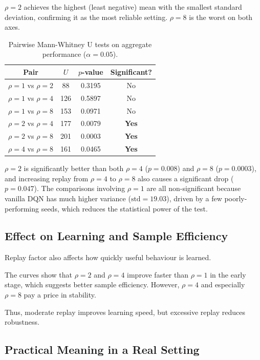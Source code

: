 \documentclass[11pt,a4paper]{article}
\begin{document}
\(\rho=2\) achieves the highest (least negative) mean with the smallest standard deviation, confirming it as the most reliable setting. \(\rho=8\) is the worst on both axes.

\begin{table}[H]
\centering
\caption{Pairwise Mann-Whitney U tests on aggregate performance (\(\alpha=0.05\)).}
\label{tab:q4a_mwu}
\renewcommand{\arraystretch}{1.2}
\begin{tabular}{cccc}
\toprule
Pair & \(U\) & \(p\)-value & Significant? \\
\midrule
\(\rho=1\) vs \(\rho=2\) & 88  & 0.3195 & No  \\
\(\rho=1\) vs \(\rho=4\) & 126 & 0.5897 & No  \\
\(\rho=1\) vs \(\rho=8\) & 153 & 0.0971 & No  \\
\(\rho=2\) vs \(\rho=4\) & 177 & 0.0079 & \textbf{Yes} \\
\(\rho=2\) vs \(\rho=8\) & 201 & 0.0003 & \textbf{Yes} \\
\(\rho=4\) vs \(\rho=8\) & 161 & 0.0465 & \textbf{Yes} \\
\bottomrule
\end{tabular}
\end{table}

\(\rho=2\) is significantly better than both \(\rho=4\) (\(p=0.008\)) and \(\rho=8\) (\(p=0.0003\)), and increasing replay from \(\rho=4\) to \(\rho=8\) also causes a significant drop (\(p=0.047\)). The comparisons involving \(\rho=1\) are all non-significant because vanilla DQN has much higher variance (\(\text{std}=19.03\)), driven by a few poorly-performing seeds, which reduces the statistical power of the test.

\subsection*{Effect on Learning and Sample Efficiency}

Replay factor also affects how quickly useful behaviour is learned.

The curves show that \(\rho=2\) and \(\rho=4\) improve faster than \(\rho=1\) in the early stage, which suggests better sample efficiency. However, \(\rho=4\) and especially \(\rho=8\) pay a price in stability.

Thus, moderate replay improves learning speed, but excessive replay reduces robustness.

\subsection*{Practical Meaning in a Real Setting}
\end{document}
